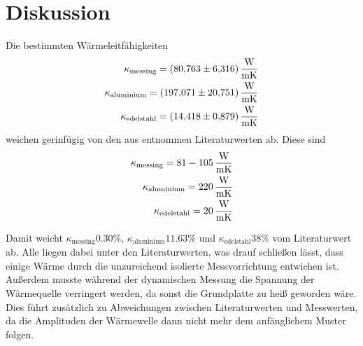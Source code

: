 \section{Diskussion}
\label{sec:Diskussion}

Die bestimmten Wärmeleitfähigkeiten 
\begin{align*}
\kappa _\text{messing} = \SI{80.763(6316)}{\frac{\watt}{\meter\kelvin}}     \\
\kappa _\text{aluminium} = \SI{197.071(20751)}{\frac{\watt}{\meter\kelvin}}\\
\kappa _\text{edelstahl} = \SI{14.418(879)}{\frac{\watt}{\meter\kelvin}}\\
\end{align*}
\FloatBarrier
weichen gerinfügig von den aus \cite{leitfaehigkeit} entnommen Literaturwerten ab.
Diese sind 
\begin{align*}
\kappa _\text{messing} = 81 - \SI{105}{\frac{\watt}{\meter\kelvin}}\\
\kappa _\text{aluminium} = \SI{220}{\frac{\watt}{\meter\kelvin}}\\
\kappa _\text{edelstahl} = \SI{20}{\frac{\watt}{\meter\kelvin}}\\
\end{align*}

Damit weicht $\kappa _\text{messing} 0.30 \%$, $\kappa _\text{aluminium} 11.63 \%$ und $\kappa _\text{edelstahl} 38\%$ vom Literaturwert ab.
Alle liegen dabei unter den Literaturwerten, was drauf schließen lässt, dass einige Wärme durch die unzureichend isolierte Messvorrichtung entwichen ist.
Außerdem musste während der dynamischen Messung die Spannung der Wärmequelle verringert werden, da sonst die Grundplatte zu heiß geworden wäre.
Dies führt zusätzlich zu Abweichungen zwischen Literaturwerten und Messwerten, da die Amplituden der Wärmewelle dann nicht mehr dem anfänglichem Muster folgen.
